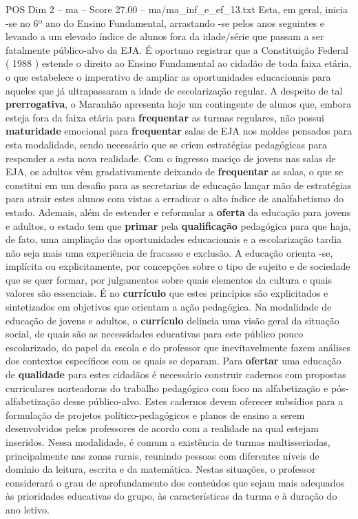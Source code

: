 \begin{textsample}{POS Dim 2 – ma – Score 27.00 – ma/ma\_inf\_e\_ef\_13.txt}
Esta, em geral, inicia -se no 6º ano do Ensino Fundamental, arrastando -se pelos anos seguintes e levando a um elevado índice de alunos fora da idade/série que passam a ser fatalmente público-alvo da EJA.
É oportuno registrar que a Constituição Federal ( 1988 ) estende o direito ao Ensino Fundamental ao cidadão de toda faixa etária, o que estabelece o imperativo de ampliar as oportunidades educacionais para aqueles que já ultrapassaram a idade de escolarização regular.
A despeito de tal \textbf{prerrogativa}, o Maranhão apresenta hoje um contingente de alunos que, embora esteja fora da faixa etária para \textbf{frequentar} as turmas regulares, não possui \textbf{maturidade} emocional para \textbf{frequentar} salas de EJA nos moldes pensados para esta modalidade, sendo necessário que se criem estratégias pedagógicas para responder a esta nova realidade.
Com o ingresso maciço de jovens nas salas de EJA, os adultos vêm gradativamente deixando de \textbf{frequentar} as salas, o que se constitui em um desafio para as secretarias de educação lançar mão de estratégias para atrair estes alunos com vistas a erradicar o alto índice de analfabetismo do estado.
Ademais, além de estender e reformular a \textbf{oferta} da educação para jovens e adultos, o estado tem que \textbf{primar} pela \textbf{qualificação} pedagógica para que haja, de fato, uma ampliação das oportunidades educacionais e a escolarização tardia não seja mais uma experiência de fracasso e exclusão.
A educação orienta -se, implícita ou explicitamente, por concepções sobre o tipo de sujeito e de sociedade que se quer formar, por julgamentos sobre quais elementos da cultura e quais valores são essenciais.
É no \textbf{currículo} que estes princípios são explicitados e sintetizados em objetivos que orientam a ação pedagógica.
Na modalidade de educação de jovens e adultos, o \textbf{currículo} delineia uma visão geral da situação social, de quais são as necessidades educativas para este público pouco escolarizado, do papel da escola e do professor que inevitavelmente fazem análises dos contextos específicos com os quais se deparam.
Para \textbf{ofertar} uma educação de \textbf{qualidade} para estes cidadãos é necessário construir cadernos com propostas curriculares norteadoras do trabalho pedagógico com foco na alfabetização e pós-alfabetização desse público-alvo.
Estes cadernos devem oferecer subsídios para a formulação de projetos político-pedagógicos e planos de ensino a serem desenvolvidos pelos professores de acordo com a realidade na qual estejam inseridos.
Nessa modalidade, é comum a existência de turmas multisseriadas, principalmente nas zonas rurais, reunindo pessoas com diferentes níveis de domínio da leitura, escrita e da matemática.
Nestas situações, o professor considerará o grau de aprofundamento dos conteúdos que sejam mais adequados às prioridades educativas do grupo, às características da turma e à duração do ano letivo.


\end{textsample}
